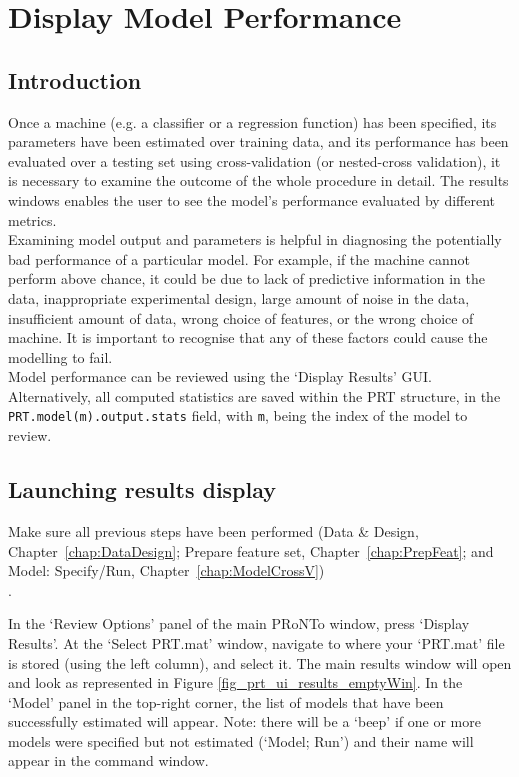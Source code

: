 %


\chapter{Display Model Performance}
\label{chap:DisRes}
\minitoc

\section{Introduction}

Once a machine (e.g. a classifier or a regression function) has been specified, its parameters have been estimated over training data, and its performance has been evaluated over a testing set using cross-validation (or nested-cross validation), it is necessary to examine the outcome of the whole procedure in detail. The results windows enables the user to see the model's performance evaluated by different metrics.
\\

Examining model output and parameters is helpful in diagnosing the potentially bad performance of a particular model. For example, if the machine cannot perform above chance, it could be due to lack of predictive information in the data, inappropriate experimental design, large amount of noise in the data, insufficient amount of data, wrong choice of features,  or the wrong choice of machine. It is important to recognise that any of these factors could cause the modelling to fail. 
\\

Model performance can be reviewed using the `Display Results' GUI. Alternatively, all computed statistics are saved within the PRT structure, in the \texttt{PRT.model(m).output.stats} field, with \texttt{m}, being the index of the model to review.

\section{Launching results display}

Make sure all previous steps have been performed (Data \& Design, Chapter~\ref{chap:DataDesign}; Prepare feature set, Chapter~\ref{chap:PrepFeat}; and Model: Specify/Run, Chapter~\ref{chap:ModelCrossV})
\\.

In the `Review Options' panel of the main PRoNTo window, press `Display Results'. At the `Select PRT.mat' window, navigate to where your `PRT.mat' file is stored (using the left column), and select it. The main results window will open and look as represented in Figure \ref{fig_prt_ui_results_emptyWin}. In the `Model' panel in the top-right corner, the list of models that have been successfully estimated will appear. Note: there will be a `beep' if one or more models were specified but not estimated (`Model; Run') and their name will appear in the command window.

